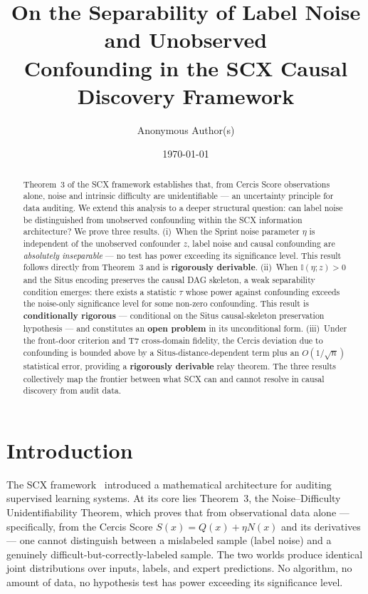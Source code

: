 \documentclass[12pt,a4paper]{article}
\title{\bfseries On the Separability of Label Noise and Unobserved\\
Confounding in the SCX Causal Discovery Framework}
\author{Anonymous Author(s)}
\date{\today}
\newcommand{\I}{\mathbb{I}}
\begin{document}
\maketitle

\begin{abstract}
Theorem~3 of the SCX framework establishes that, from Cercis Score observations
alone, noise and intrinsic difficulty are unidentifiable — an uncertainty
principle for data auditing.  We extend this analysis to a deeper structural
question: can label noise be distinguished from unobserved confounding within
the SCX information architecture?  We prove three results.  (i)~When the Sprint
noise parameter $\eta$ is independent of the unobserved confounder $z$, label
noise and causal confounding are \emph{absolutely inseparable} — no test has
power exceeding its significance level.  This result follows directly from
Theorem~3 and is \textbf{rigorously derivable}.  (ii)~When $\I(\eta;z)>0$ and
the Situs encoding preserves the causal DAG skeleton, a weak separability
condition emerges: there exists a statistic $\tau$ whose power against
confounding exceeds the noise-only significance level for some non-zero
confounding.  This result is \textbf{conditionally rigorous} — conditional on
the Situs causal-skeleton preservation hypothesis — and constitutes an
\textbf{open problem} in its unconditional form.  (iii)~Under the front-door
criterion and T7 cross-domain fidelity, the Cercis deviation due to confounding
is bounded above by a Situs-distance-dependent term plus an $O(1/\sqrt{n})$
statistical error, providing a \textbf{rigorously derivable} relay theorem.  The
three results collectively map the frontier between what SCX can and cannot
resolve in causal discovery from audit data.
\end{abstract}

\section{Introduction}

The SCX framework~\citep{scx2024cercis} introduced a mathematical architecture
for auditing supervised learning systems.  At its core lies Theorem~3, the
Noise--Difficulty Unidentifiability Theorem, which proves that from
observational data alone — specifically, from the Cercis Score $S(x) = Q(x) +
\eta N(x)$ and its derivatives — one cannot distinguish between a mislabeled
sample (label noise) and a genuinely difficult-but-correctly-labeled sample.
The two worlds produce identical joint distributions over inputs, labels, and
expert predictions.  No algorithm, no amount of data, no hypothesis test has
power exceeding its significance level.
\end{document}
